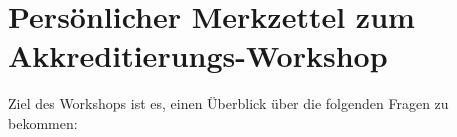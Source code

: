 \documentclass{scrartcl}
\begin{document}
\thispagestyle{empty}
\section*{Persönlicher Merkzettel zum Akkreditierungs-Workshop}

Ziel des Workshops ist es, einen Überblick über die folgenden Fragen zu bekommen:
\vspace{0.5 cm}
\end{document}
